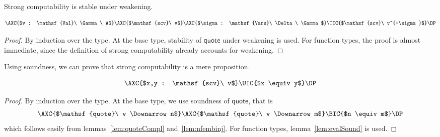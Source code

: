 \documentclass[a4paper,english,cleveref,autoref,draft]{lipics-v2019}
\newcommand{\agdaSymb}[1]{\mathsf{#1}}
\newcommand{\Vars}{\agdaSymb{Vars}}
\newcommand{\Val}{\agdaSymb{Val}}
\newcommand{\q}{\agdaSymb{quote}}
\newcommand{\scv}{\agdaSymb{scv}}
\newcommand{\Da}{\Downarrow}
\begin{document}
Strong computability is stable under weakening.
\begin{lemma}
  \label{lem:scvWk}
  \[
    \AXC{$v : \Val\ \Gamma\ A$}
    \AXC{$\scv\ v$}
    \AXC{$\sigma : \Vars\ \Delta\ \Gamma$}
    \TIC{$\scv\ v^{+\sigma}$}
    \DP
  \]
\end{lemma}
\begin{proof}
  By induction over the type.
  At the base type, stability of $\q$ under weakening is used.
  For function types, the proof is almost immediate, since
  the definition of strong computability already accounts for weakening.
\end{proof}

Using soundness, we can prove that strong computability is a mere proposition.
\begin{lemma}
  \label{lem:scvProp}
  \[
    \AXC{$x,y : \scv\ v$}
    \UIC{$x \equiv y$}
    \DP
  \]
\end{lemma}
\begin{proof}
  By induction over the type.
  At the base type, we use soundness of $\q$, that is
  \[
    \AXC{$\q\ v \Da n$}
    \AXC{$\q\ v \Da m$}
    \BIC{$n \equiv m$}
    \DP
  \]
  which follows easily from lemmas~\ref{lem:quoteCompl} and~\ref{lem:nfembinj}.
  For function types, lemma~\ref{lem:evalSound} is used.
\end{proof}
\end{document}
